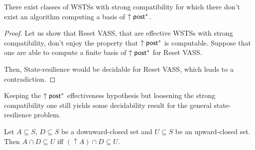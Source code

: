 \begin{proposition}
There exist classes of WSTSs with strong 
 compatibility for which there don't exist an algorithm computing a basis of $\uparrow \textsf{post}^*$.
\end{proposition}


\begin{proof}
Let us show that Reset VASS, that are effective WSTSs with strong compatibility, don't enjoy the property that $\uparrow \textsf{post}^*$ is computable.
Suppose that one are able to compute a finite basis of $\uparrow \textsf{post}^*$ for Reset VASS. 
\iffalse
Then, one would be able to decide whether an element $m \in Min(\uparrow \post^*)$ is reachable.
by examining if there is %
$0$ in the basis%
. But reachability of $0$  %
is undecidable for Reset VASS. 
\fi
Then, {\sc State-resilience} would be decidable for Reset VASS, which leads to a contradiction.
\end{proof}



%
%
%











Keeping the $\uparrow \textsf{post}^*$ effectiveness hypothesis but loosening the strong compatibility one still yields some decidability result for the general state-resilience problem.


\begin{lemma}\label{Lemma intersection}
Let $A \subseteq S$, $D \subseteq S$ be a downward-closed set and $U \subseteq S$ be an upward-closed set. 
Then $A \cap D \subseteq U$  iff $ (\uparrow  A) \cap D \subseteq U$.
\end{lemma}



